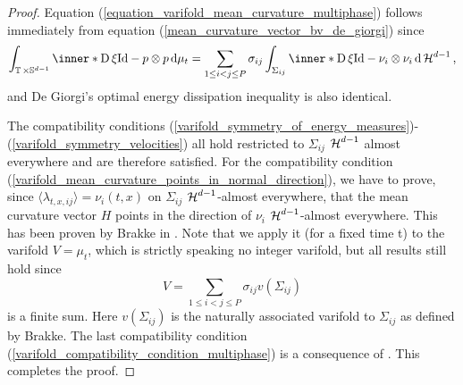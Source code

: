 \begin{proof}
	Equation (\ref{equation_varifold_mean_curvature_multiphase}) follows 
	immediately from equation (\ref{mean_curvature_vector_bv_de_giorgi})
	since
	\begin{equation*}
		\int_{ \flattorus \times \mathbb{ S }^{ d - 1 } }
			\inner*{ \diff \xi }{ \mathrm{Id} - p \otimes p }
		\dd{ \mu_{ t } }
		=
		\sum_{ 1 \leq i < j \leq P }
			\sigma_{ i j }
			\int_{ \Sigma_{ i j } }
				\inner*{ \diff \xi }{\mathrm{Id} - \nu_{i } \otimes \nu_{ i } }
			\dd{ \hm^{ d - 1 } },
	\end{equation*}
	and De Giorgi's optimal energy dissipation inequality is also identical.
	
	The compatibility conditions 
	(\ref{varifold_symmetry_of_energy_measures})-(\ref{varifold_symmetry_velocities})
	all hold restricted to $ \Sigma_{ i j } $ $ \operatorname{\mathcal{H}}^{ d - 1 } $ almost 
	everywhere and are therefore satisfied.
	For the compatibility condition 
	(\ref{varifold_mean_curvature_points_in_normal_direction}), we have to 
	prove, since $ \langle \lambda_{ t , x , i j } \rangle = \nu_{ i } ( t , 
	x ) $ on $ \Sigma_{ i j } $ $ \operatorname{\mathcal{H}}^{ d- 1 } $-almost everywhere, that the 
	mean curvature vector $ H $ points in the direction of $ \nu_{ i } $ $ 
	\operatorname{\mathcal{H}}^{ d - 1 } $-almost everywhere. This has been proven by Brakke in 
	\cite[Thm.~5.8]{brakke_kenneth_motion_of_surface_by_mean_curvature}. Note 
	that we apply it (for a fixed time t) to the varifold $ V = \mu_{ t } $, 
	which is strictly speaking no integer varifold, but all results still hold 
	since 
	\begin{equation*}
		V = 
		\sum_{ 1 \leq i < j \leq P }
			\sigma_{ i j }
			v ( \Sigma_{ i j } )
	\end{equation*}
	is a finite sum. Here $ v ( \Sigma_{ i j } ) $ is the naturally associated 
	varifold to $ \Sigma_{ i j } $ as defined by Brakke.
	The last compatibility condition 
	(\ref{varifold_compatibility_condition_multiphase}) is a consequence of 
	. 
	This completes the proof.
\end{proof}

